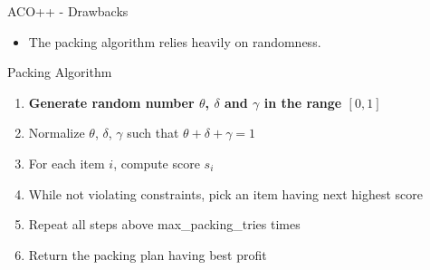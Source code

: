 \documentclass[aspectratio=169]{beamer}
\begin{document}
\begin{frame}{ACO++ - Drawbacks}
\begin{itemize}
    \item The packing algorithm relies heavily on randomness.
\end{itemize}
\begin{block} {Packing Algorithm}
\begin{enumerate}
    \vspace{0.2cm}
    \color{red}
    \item \textbf{Generate random number $\theta$, $\delta$ and $\gamma$ in the range $[0, 1]$}
    \color{black}
    \vspace{0.2cm}
    \item Normalize $\theta$, $\delta$, $\gamma$ such that $\theta + \delta + \gamma = 1$
    \vspace{0.2cm}
    \item For each item $i$, compute score $s_i$
    \vspace{0.2cm}
    \item While not violating constraints, pick an item having next highest score
    \vspace{0.2cm}
    \item Repeat all steps above max\_packing\_tries times
    \vspace{0.2cm}
    \item Return the packing plan having best profit
    \vspace{0.2cm}
\end{enumerate}
\end{block}
\end{frame}
\end{document}
